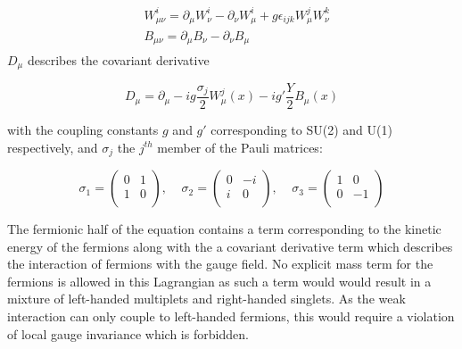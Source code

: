 \documentclass[12pt,a4paper,epsf,portrait,times,epsfig]{article}
\begin{document}
		\begin{align}
			\begin{split}
				&W_{\mu\nu}^{i} = \partial_{\mu}W_{\nu}^{i}-\partial_{\nu}W_{\mu}^{i}+g\epsilon_{ijk}W_{\mu}^{j}W_{\nu}^{k} \\
				&B_{\mu\nu} = \partial_{\mu}B_{\nu}-\partial_{\nu}B_{\mu}
			\end{split}
		\end{align}
			$D_{\mu}$ describes the covariant derivative
		
		\begin{center}
			\begin{equation}
				D_{\mu} = \partial_{\mu}-ig\frac{\sigma_{j}}{2}W_{\mu}^{j}(x)-ig'\frac{Y}{2}B_{\mu}(x)
			\end{equation}
		\end{center}
		
		with the coupling constants $g$ and $g'$ corresponding to SU(2) and U(1) respectively, and $\sigma_{j}$ the $j^{th}$ member of the Pauli matrices:
		
		\begin{center}
			\begin{equation}
				\sigma_{1}=\begin{pmatrix}
				0 & 1 \\
				1 & 0  \\
				\end{pmatrix},\;\;\;\;\sigma_{2}=\begin{pmatrix}
				0 & -i \\
				i & 0 \\
				\end{pmatrix},\;\;\;\;\sigma_{3}=\begin{pmatrix}
				1 & 0 \\
				0 & -1 \\
				\end{pmatrix}
			\end{equation}
		\end{center} The fermionic half of the equation contains a term corresponding to the kinetic energy of the fermions along with the a covariant derivative term which describes the interaction of fermions with the gauge field. No explicit mass term for the fermions is allowed in this Lagrangian as such a term would would result in a mixture of left-handed multiplets and right-handed singlets. As the weak interaction can only couple to left-handed fermions, this would require a violation of local gauge invariance which is forbidden. \par
		
\end{document}
